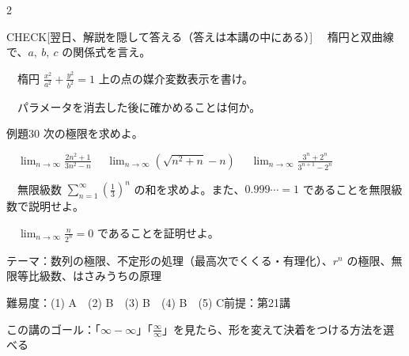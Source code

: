 \documentclass[paper=b5j, fontsize=8pt, fleqn, twoside]{jlreq}
\begin{document}
\begin{multicols*}{2}
  \begin{ptbs}{CHECK}[翌日、解説を隠して答える（答えは本講の中にある）]
    　楕円と双曲線で、$a,\ b,\ c$ の関係式を言え。\par
    　楕円 $\frac{x^2}{a^2}+\frac{y^2}{b^2}=1$ 上の点の媒介変数表示を書け。\par
    　パラメータを消去した後に確かめることは何か。
  \end{ptbs}

  \notefill
\end{multicols*}
\begin{ascolorbox4A}[出典：オリジナル]{例題30}
  次の極限を求めよ。\par
  　$\displaystyle\lim_{n\to\infty}\frac{2n^2+1}{3n^2-n}$\qquad
  　$\displaystyle\lim_{n\to\infty}\left(\sqrt{n^2+n}-n\right)$\qquad
  　$\displaystyle\lim_{n\to\infty}\frac{3^n+2^n}{3^{n+1}-2^n}$\par
  　無限級数 $\displaystyle\sum_{n=1}^\infty\left(\frac13\right)^n$ の和を求めよ。また、$0.999\cdots=1$ であることを無限級数で説明せよ。\par
  　$\displaystyle\lim_{n\to\infty}\frac n{2^n}=0$ であることを証明せよ。
\end{ascolorbox4A}

\begin{Data}
  テーマ：数列の極限、不定形の処理（最高次でくくる・有理化）、$r^n$ の極限、無限等比級数、はさみうちの原理\par
  難易度：(1) A　(2) B　(3) B　(4) B　(5) C\quad 前提：第21講\par
  この講のゴール：「$\infty-\infty$」「$\frac\infty\infty$」を見たら、形を変えて決着をつける方法を選べる
\end{Data}
\end{document}
